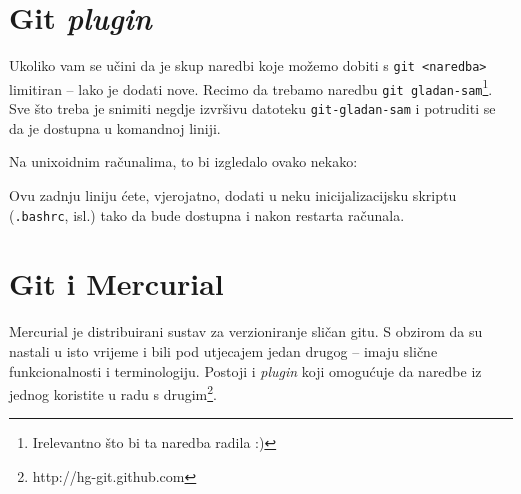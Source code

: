 \section*{Git \emph{plugin}}

Ukoliko vam se učini da je skup naredbi koje možemo dobiti s \verb+git <naredba>+ limitiran -- lako je dodati nove.
Recimo da trebamo naredbu \verb+git gladan-sam+\footnote{Irelevantno što bi ta naredba radila :)}.
Sve što treba je snimiti negdje izvršivu datoteku \verb+git-gladan-sam+ i potruditi se da je dostupna u komandnoj liniji.

Na unixoidnim računalima, to bi izgledalo ovako nekako:


Ovu zadnju liniju ćete, vjerojatno, dodati u neku inicijalizacijsku skriptu (\verb+.bashrc+, isl.) tako da bude dostupna i nakon restarta računala.

%
%
%

%

\section*{Git i Mercurial}

Mercurial je distribuirani sustav za verzioniranje sličan gitu.
S obzirom da su nastali u isto vrijeme i bili pod utjecajem jedan drugog -- imaju slične funkcionalnosti i terminologiju.
Postoji i \emph{plugin} koji omogućuje da naredbe iz jednog koristite u radu s drugim\footnote{http://hg-git.github.com}.

